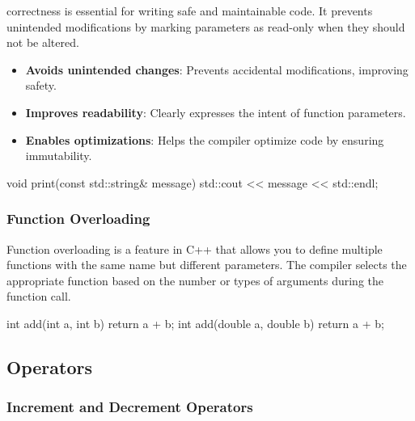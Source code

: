 \begin{warningblock}
     correctness is essential for writing safe and maintainable code. It prevents unintended modifications by marking parameters as read-only when they should not be altered.
    
    \begin{itemize}
        \item \textbf{Avoids unintended changes}: Prevents accidental modifications, improving safety.
        \item \textbf{Improves readability}: Clearly expresses the intent of function parameters.
        \item \textbf{Enables optimizations}: Helps the compiler optimize code by ensuring immutability.
    \end{itemize}

    \begin{codeblock}[language=C++, numbers = none]
void print(const std::string& message) {
    std::cout << message << std::endl;
}
    \end{codeblock}
\end{warningblock}



\subsubsection{Function Overloading} \label{function-overloading}

Function overloading is a feature in C++ that allows you to define multiple functions with the same name but different parameters. The compiler selects the appropriate function based on the number or types of arguments during the function call.

\vspace{-0.5em}

\begin{multicols}{2}
\begin{codeblock}[language=C++]
int add(int a, int b) {
    return a + b;
}
int add(double a, double b) {
    return a + b;
}
\end{codeblock}
\end{multicols}

\subsection{Operators}

\subsubsection{Increment and Decrement Operators}

